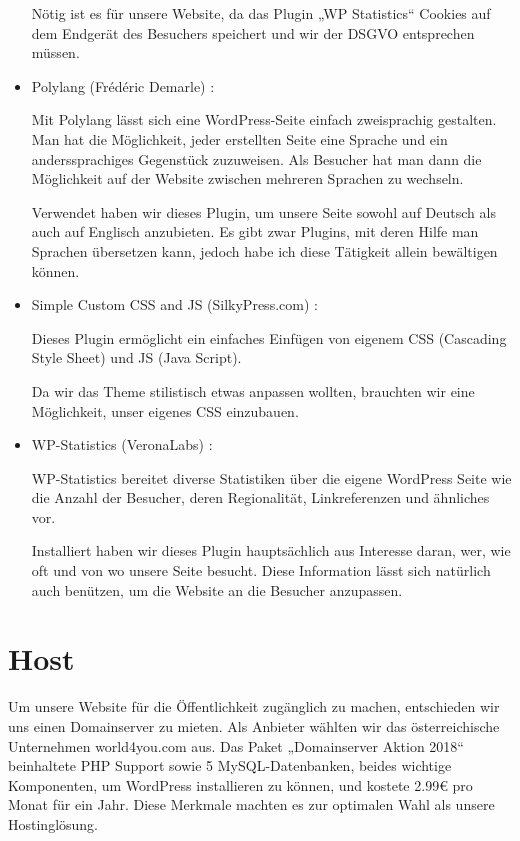 \begin{itemize}
    Nötig ist es für unsere Website, da das Plugin „WP Statistics“ Cookies auf dem Endgerät des Besuchers speichert und wir der DSGVO entsprechen müssen.

    \item Polylang (Frédéric Demarle) \citep{website:Polylang}:

    Mit Polylang lässt sich eine WordPress-Seite einfach zweisprachig gestalten. Man hat die Möglichkeit, jeder erstellten Seite eine Sprache und ein anderssprachiges Gegenstück zuzuweisen. Als Besucher hat man dann die Möglichkeit auf der Website zwischen mehreren Sprachen zu wechseln.

    Verwendet haben wir dieses Plugin, um unsere Seite sowohl auf Deutsch als auch auf Englisch anzubieten. Es gibt zwar Plugins, mit deren Hilfe man Sprachen übersetzen kann, jedoch habe ich diese Tätigkeit allein bewältigen können.

    \item Simple Custom CSS and JS (SilkyPress.com) \citep{website:SimpleCustomCSSJS}:

    Dieses Plugin ermöglicht ein einfaches Einfügen von eigenem CSS (Cascading Style Sheet) und JS (Java Script).

    Da wir das Theme stilistisch etwas anpassen wollten, brauchten wir eine Möglichkeit, unser eigenes CSS einzubauen.

    \item WP-Statistics (VeronaLabs) \citep{website:WPStats}:

    WP-Statistics bereitet diverse Statistiken über die eigene WordPress Seite wie die Anzahl der Besucher, deren Regionalität, Linkreferenzen und ähnliches vor.

    Installiert haben wir dieses Plugin hauptsächlich aus Interesse daran, wer, wie oft und von wo unsere Seite besucht. Diese Information lässt sich natürlich auch benützen, um die Website an die Besucher anzupassen.
\end{itemize}
\section{Host}
Um unsere Website für die Öffentlichkeit zugänglich zu machen, entschieden wir uns einen Domainserver zu mieten. Als Anbieter wählten wir das österreichische Unternehmen world4you.com aus. Das Paket „Domainserver Aktion 2018“ beinhaltete PHP Support sowie 5 MySQL-Datenbanken, beides wichtige Komponenten, um WordPress installieren zu können, und kostete 2.99€ pro Monat für ein Jahr. Diese Merkmale machten es zur optimalen Wahl als unsere Hostinglösung. \citep{website:Host}
